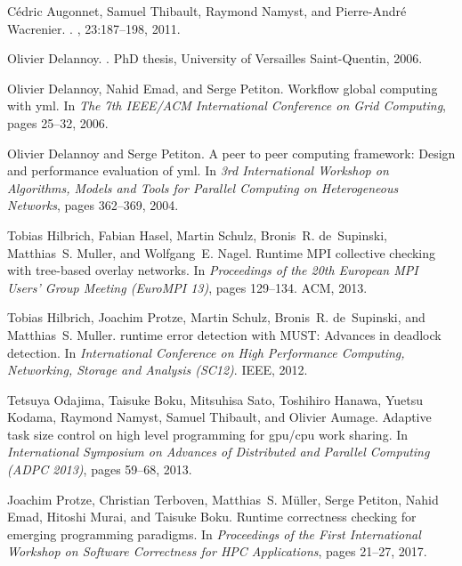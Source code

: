 \documentclass[graybox]{svmult}
\begin{document}
\begin{thebibliography}{10}

C{\'e}dric Augonnet, Samuel Thibault, Raymond Namyst, and Pierre-Andr{\'e}
  Wacrenier.
.
, 23:187--198, 2011.

Olivier Delannoy.
.
\newblock PhD thesis, University of Versailles Saint-Quentin, 2006.

Olivier Delannoy, Nahid Emad, and Serge Petiton.
\newblock Workflow global computing with yml.
\newblock In {\em The 7th IEEE/ACM International Conference on Grid Computing},
  pages 25--32, 2006.

Olivier Delannoy and Serge Petiton.
\newblock A peer to peer computing framework: Design and performance evaluation
  of yml.
\newblock In {\em 3rd International Workshop on Algorithms, Models and Tools
  for Parallel Computing on Heterogeneous Networks}, pages 362--369, 2004.

Tobias Hilbrich, Fabian Hasel, Martin Schulz, Bronis~R. de~Supinski,
  Matthias~S. Muller, and Wolfgang~E. Nagel.
\newblock Runtime {MPI} collective checking with tree-based overlay networks.
\newblock In {\em Proceedings of the 20th European MPI Users' Group Meeting
  (EuroMPI 13)}, pages 129--134. ACM, 2013.

Tobias Hilbrich, Joachim Protze, Martin Schulz, Bronis~R. de~Supinski, and
  Matthias~S. Muller.
 runtime error detection with {MUST}: Advances in deadlock
  detection.
\newblock In {\em International Conference on High Performance Computing,
  Networking, Storage and Analysis (SC12)}. IEEE, 2012.

Tetsuya Odajima, Taisuke Boku, Mitsuhisa Sato, Toshihiro Hanawa, Yuetsu Kodama,
  Raymond Namyst, Samuel Thibault, and Olivier Aumage.
\newblock Adaptive task size control on high level programming for gpu/cpu work
  sharing.
\newblock In {\em International Symposium on Advances of Distributed and
  Parallel Computing (ADPC 2013)}, pages 59--68, 2013.

Joachim Protze, Christian Terboven, Matthias~S. M{\"u}ller, Serge Petiton,
  Nahid Emad, Hitoshi Murai, and Taisuke Boku.
\newblock Runtime correctness checking for emerging programming paradigms.
\newblock In {\em Proceedings of the First International Workshop on Software
  Correctness for HPC Applications}, pages 21--27, 2017.


\end{thebibliography}
\end{document}
